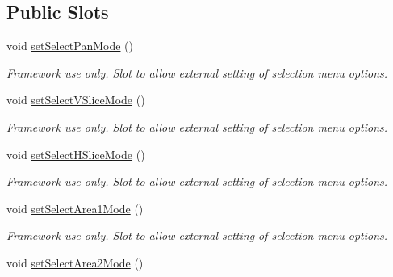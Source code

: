 \subsection*{Public Slots}
\begin{DoxyCompactItemize}
\item 
\hypertarget{classQEImage_a2f7e95b2caa13575295e4b3f3209867c}{
void \hyperlink{classQEImage_a2f7e95b2caa13575295e4b3f3209867c}{setSelectPanMode} ()}
\label{classQEImage_a2f7e95b2caa13575295e4b3f3209867c}

\begin{DoxyCompactList}\small\item\em Framework use only. Slot to allow external setting of selection menu options. \end{DoxyCompactList}\item 
\hypertarget{classQEImage_a7721fe9dc36cd4ecd5d300277c3e5e16}{
void \hyperlink{classQEImage_a7721fe9dc36cd4ecd5d300277c3e5e16}{setSelectVSliceMode} ()}
\label{classQEImage_a7721fe9dc36cd4ecd5d300277c3e5e16}

\begin{DoxyCompactList}\small\item\em Framework use only. Slot to allow external setting of selection menu options. \end{DoxyCompactList}\item 
\hypertarget{classQEImage_ab353c3c1ad746c17d8df8c46701df8d9}{
void \hyperlink{classQEImage_ab353c3c1ad746c17d8df8c46701df8d9}{setSelectHSliceMode} ()}
\label{classQEImage_ab353c3c1ad746c17d8df8c46701df8d9}

\begin{DoxyCompactList}\small\item\em Framework use only. Slot to allow external setting of selection menu options. \end{DoxyCompactList}\item 
\hypertarget{classQEImage_a86cef49c432da24c017c835d660ffdb4}{
void \hyperlink{classQEImage_a86cef49c432da24c017c835d660ffdb4}{setSelectArea1Mode} ()}
\label{classQEImage_a86cef49c432da24c017c835d660ffdb4}

\begin{DoxyCompactList}\small\item\em Framework use only. Slot to allow external setting of selection menu options. \end{DoxyCompactList}\item 
\hypertarget{classQEImage_a338cda98df172531723e6c116916905d}{
void \hyperlink{classQEImage_a338cda98df172531723e6c116916905d}{setSelectArea2Mode} ()}
\label{classQEImage_a338cda98df172531723e6c116916905d}


\end{DoxyCompactItemize}
